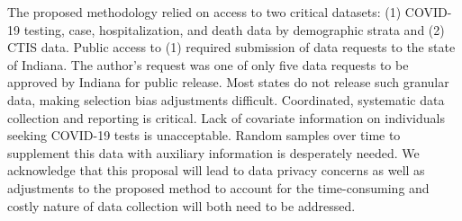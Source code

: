 \documentclass[11pt]{amsart}
\numberwithin{equation}{section}
\theoremstyle{plain}
\begin{document}
 The proposed methodology relied on access to two critical datasets: (1) COVID-19 testing, case, hospitalization, and death data by demographic strata and (2) CTIS data.  Public access to (1) required submission of data requests to the state of Indiana.  The author's request was one of only five data requests to be approved by Indiana for public release.  Most states do not release such granular data, making selection bias adjustments difficult.  Coordinated, systematic data collection and reporting is critical.
 Lack of covariate information on individuals seeking COVID-19 tests is unacceptable.  Random samples over time to supplement this data with auxiliary information is desperately needed.  We acknowledge that this proposal will lead to data privacy concerns as well as adjustments to the proposed method to account for the time-consuming and costly nature of data collection will both need to be addressed.



\end{document}
